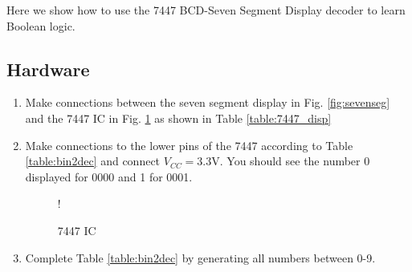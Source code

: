 Here we show how to use the 7447 BCD-Seven Segment Display decoder to learn Boolean logic.
\subsection{Hardware}
\begin{enumerate}[label=\arabic*.,ref=\theenumi]
\item
Make connections between the seven segment display in Fig. \ref{fig:sevenseg} and the  7447 IC in Fig. \ref{fig:7447} as shown in Table \ref{table:7447_disp}
%
\iffalse
\begin{table}[H]
\centering

\caption{7447 components}
\label{table:components-7447}
\end{table}
\fi
%
\begin{table}[H]
\centering

\caption{}
\label{table:7447_disp}
\end{table}
%
\iffalse
\begin{figure}[H]
\begin{center}
\resizebox {0.5\columnwidth} {!} {

}
\end{center}
\caption{}
\label{fig:sevenseg}
\end{figure}
\fi
\item
Make connections to the lower pins of the 7447 according to
Table \ref{table:bin2dec} and connect $V_{CC} = 3.3$V. You should see the number 0 displayed for 0000 and 1 for 0001.

%
\begin{table}[H]
\centering

\caption{}
\label{table:bin2dec}
\end{table}
%
\begin{figure}[H]
	\centering
\resizebox {\columnwidth} {!} {

}
\caption{7447 IC}
\label{fig:7447}
\end{figure}
%
\item
Complete Table \ref{table:bin2dec} by generating all numbers between 0-9.

	\end{enumerate}

